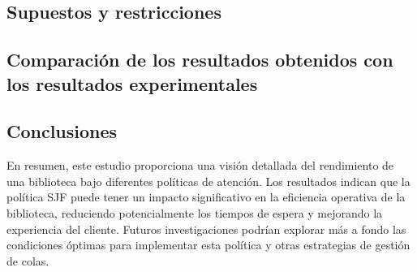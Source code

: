 \documentclass[10pt,twocolumn]{article}
\begin{document}
	\subsection{Supuestos y restricciones}
	\subsection{Comparación de los resultados obtenidos con los resultados experimentales}
	
	\subsection{Conclusiones}
	En resumen, este estudio proporciona una visión detallada del rendimiento de una biblioteca bajo diferentes políticas de atención. Los resultados indican que la política SJF puede tener un impacto significativo en la eficiencia operativa de la biblioteca, reduciendo potencialmente los tiempos de espera y mejorando la experiencia del cliente. Futuros investigaciones podrían explorar más a fondo las condiciones óptimas para implementar esta política y otras estrategias de gestión de colas.
	
\end{document}
